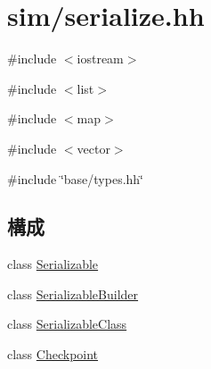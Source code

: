 \hypertarget{serialize_8hh}{
\section{sim/serialize.hh}
\label{serialize_8hh}
}
{\ttfamily \#include $<$iostream$>$}\par
{\ttfamily \#include $<$list$>$}\par
{\ttfamily \#include $<$map$>$}\par
{\ttfamily \#include $<$vector$>$}\par
{\ttfamily \#include \char`\"{}base/types.hh\char`\"{}}\par
\subsection*{構成}
\begin{DoxyCompactItemize}
\item 
class \hyperlink{classSerializable}{Serializable}
\item 
class \hyperlink{classSerializableBuilder}{SerializableBuilder}
\item 
class \hyperlink{classSerializableClass}{SerializableClass}
\item 
class \hyperlink{classCheckpoint}{Checkpoint}
\end{DoxyCompactItemize}
